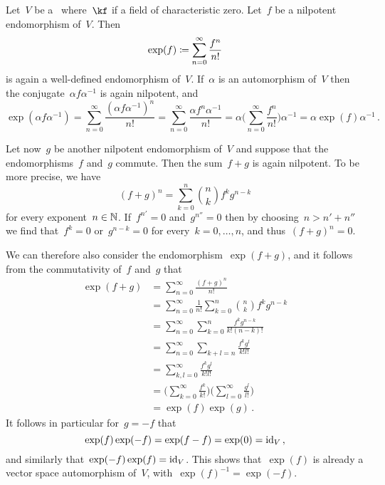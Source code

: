 \begin{recall}
  Let~$V$ be a~\vectorspace{$\kf$} where~$\kf$ if a field of characteristic zero.
  Let~$f$ be a nilpotent endomorphism of~$V$.
  Then
  \[
    \exp(f)
    \coloneqq
    \sum_{n=0}^\infty
    \frac{f^n}{n!}
  \]
  is again a well-defined endomorphism of~$V$.
  If~$\alpha$ is an automorphism of~$V$ then the conjugate~$\alpha f \alpha^{-1}$ is again nilpotent, and
  \[
    \exp( \alpha f \alpha^{-1} )
    =
    \sum_{n=0}^\infty
    \frac{ (\alpha f \alpha^{-1})^n }{n!}
    =
    \sum_{n=0}^\infty
    \frac{ \alpha f^n \alpha^{-1} }{n!}
    =
    \alpha
    \Biggl(
      \sum_{n=0}^\infty
      \frac{f^n}{n!}
    \Biggr)
    \alpha^{-1}
    =
    \alpha \exp(f) \alpha^{-1} \,.
  \]

  Let now~$g$ be another nilpotent endomorphism of~$V$ and suppose that the endomorphisms~$f$ and~$g$ commute.
  Then the sum~$f + g$ is again nilpotent.
  To be more precise, we have
  \[
    (f + g)^n
    =
    \sum_{k=0}^n
    \binom{n}{k}
    f^k g^{n-k}
  \]
  for every exponent~$n \in \mathbb{N}$.
  If~$f^{n'} = 0$ and~$g^{n''} = 0$ then by choosing~$n > n' + n''$ we find that~$f^k = 0$ or~$g^{n-k} = 0$ for every~$k = 0, \dotsc, n$, and thus~$(f + g)^n = 0$.

  We can therefore also consider the endomorphism~$\exp(f + g)$, and it follows from the commutativity of~$f$ and~$g$ that 
  \begingroup
  \allowdisplaybreaks
  \begin{align*}
    \exp(f + g)
    &=
    \sum_{n=0}^\infty
    \frac{(f + g)^n}{n!}
    \\
    &=
    \sum_{n=0}^\infty
    \frac{1}{n!}
    \sum_{k=0}^n
    \binom{n}{k}
    f^k g^{n-k}
    \\
    &=
    \sum_{n=0}^\infty
    \sum_{k=0}^n
    \frac{f^k g^{n-k}}{k!(n-k)!}
    \\
    &=
    \sum_{n=0}^\infty
    \sum_{k + l = n}
    \frac{f^k g^l}{k! l!}
    \\
    &=
    \sum_{k, l = 0}^\infty
    \frac{f^k g^l}{k! l!}
    \\
    &=
    \Biggl(
      \sum_{k=0}^\infty
      \frac{f^k}{k!}
    \Biggr)
    \Biggl(
      \sum_{l=0}^\infty
      \frac{g^l}{l!}
    \Biggr)
    \\
    &=
    \exp(f) \exp(g) \,.
  \end{align*}
  \endgroup
  It follows in particular for~$g = -f$ that
  \[
    \exp(f) \exp(-f) = \exp(f - f) = \exp(0) = \mathrm{id}_V \,,
  \]
  and similarly that~$\exp(-f) \exp(f) = \mathrm{id}_V$.
  This shows that~$\exp(f)$ is already a vector space automorphism of~$V$, with~$\exp(f)^{-1} = \exp(-f)$.
\end{recall}


